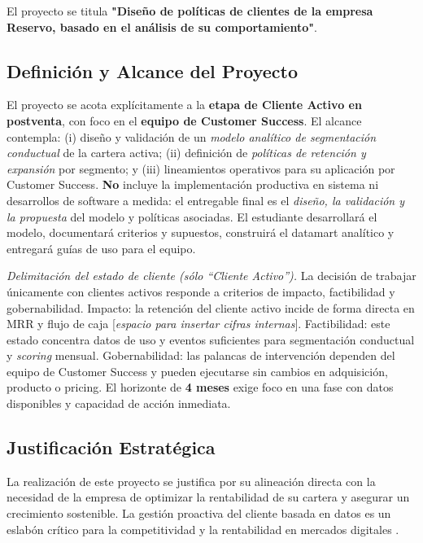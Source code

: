 El proyecto se titula \textbf{"Diseño de políticas de clientes de la empresa Reservo, basado en el análisis de su comportamiento"}.

\subsection{Definición y Alcance del Proyecto}

El proyecto se acota explícitamente a la \textbf{etapa de Cliente Activo en postventa}, con foco en el \textbf{equipo de Customer Success}. El alcance contempla: (i) diseño y validación de un \textit{modelo analítico de segmentación conductual} de la cartera activa; (ii) definición de \textit{políticas de retención y expansión} por segmento; y (iii) lineamientos operativos para su aplicación por Customer Success. \textbf{No} incluye la implementación productiva en sistema ni desarrollos de software a medida: el entregable final es el \textit{diseño, la validación y la propuesta} del modelo y políticas asociadas. El estudiante desarrollará el modelo, documentará criterios y supuestos, construirá el datamart analítico y entregará guías de uso para el equipo.

\textit{Delimitación del estado de cliente (sólo “Cliente Activo”).} La decisión de trabajar únicamente con clientes activos responde a criterios de impacto, factibilidad y gobernabilidad. Impacto: la retención del cliente activo incide de forma directa en MRR y flujo de caja [\textit{espacio para insertar cifras internas}]. Factibilidad: este estado concentra datos de uso y eventos suficientes para segmentación conductual y \textit{scoring} mensual. Gobernabilidad: las palancas de intervención dependen del equipo de Customer Success y pueden ejecutarse sin cambios en adquisición, producto o pricing. El horizonte de \textbf{4 meses} exige foco en una fase con datos disponibles y capacidad de acción inmediata.


\subsection{Justificación Estratégica}

La realización de este proyecto se justifica por su alineación directa con la necesidad de la empresa de optimizar la rentabilidad de su cartera y asegurar un crecimiento sostenible. La gestión proactiva del cliente basada en datos es un eslabón crítico para la competitividad y la rentabilidad en mercados digitales \citep{Kumar2010}.

